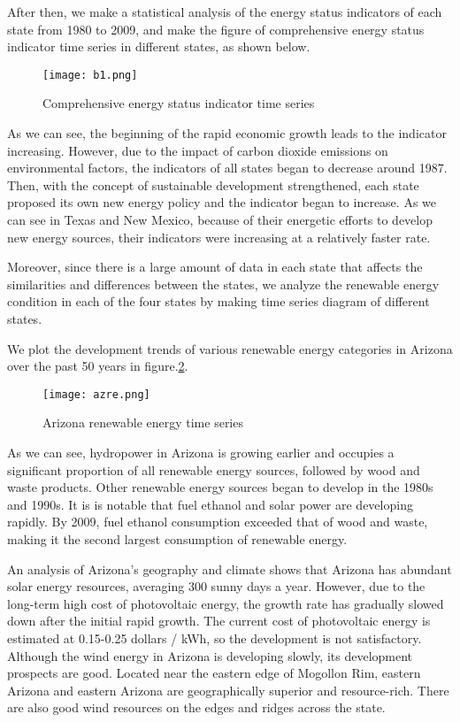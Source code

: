 \documentclass{mcmthesis}
\begin{document}
After then, we make a statistical analysis of the energy status indicators of each state from 1980 to 2009, and make the figure of comprehensive energy status indicator time series in different states, as shown below.
\begin{figure}[htb]
  \centering
  \texttt{[image: b1.png]}
  \caption{Comprehensive energy status indicator time series} \label{fig: Comprehensive energy status indicator time series}
\end{figure}

As we can see, the beginning of the rapid economic growth leads to the indicator increasing. However, due to the impact of carbon dioxide emissions on  environmental factors, the indicators of all states began to decrease around 1987. Then, with the concept of sustainable development strengthened, each state proposed its own new energy policy and the indicator began to increase. As we can see in Texas and New Mexico, because of their energetic efforts to develop new energy sources, their indicators were increasing at a relatively faster rate.

Moreover, since there is a large amount of data in each state that affects the similarities and differences between the states, we analyze the renewable energy condition in each of the four states by making time series diagram of different states.

We plot the development trends of various renewable energy categories in Arizona over the past 50 years in figure.\ref{fig: Arizona renewable energy time series}.
\begin{figure}[htb]
  \centering
  \texttt{[image: azre.png]}
  \caption{Arizona renewable energy time series} \label{fig: Arizona renewable energy time series}
\end{figure}

As we can see, hydropower in Arizona is growing earlier and occupies a significant proportion of all renewable energy sources, followed by wood and waste products. Other renewable energy sources began to develop in the 1980s and 1990s. It is is notable that fuel ethanol and solar power are developing rapidly. By 2009, fuel ethanol consumption exceeded that of wood and waste, making it the second largest consumption of renewable energy.

An analysis of Arizona's geography and climate shows that Arizona has abundant solar energy resources, averaging 300 sunny days a year. However, due to the long-term high cost of photovoltaic energy, the growth rate has gradually slowed down after the initial rapid growth. The current cost of photovoltaic energy is estimated at 0.15-0.25 dollars / kWh, so the development is not satisfactory.\cite{AZretime}
Although the wind energy in Arizona is developing slowly, its development prospects are good. Located near the eastern edge of Mogollon Rim, eastern Arizona and eastern Arizona are geographically superior and resource-rich. There are also good wind resources on the edges and ridges across the state.\cite{AZwind}
\end{document}
